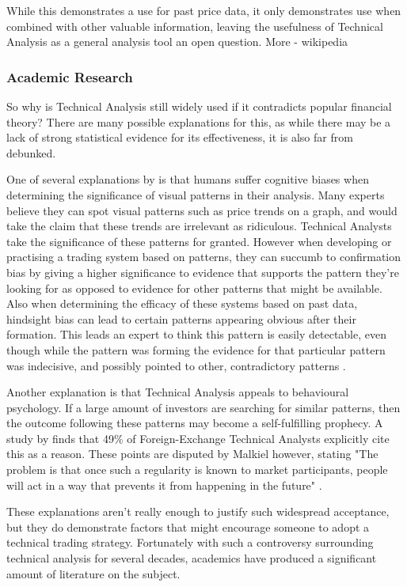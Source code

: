 \documentclass{article}
\begin{document}
While this demonstrates a use for past price data, it only demonstrates use when combined with other valuable information, leaving the usefulness of Technical Analysis as a general analysis tool an open question. More - wikipedia

\subsubsection{Academic Research}

So why is Technical Analysis still widely used if it contradicts popular financial theory? There are many possible explanations for this, as while there may be a lack of strong statistical evidence for its effectiveness, it is also far from debunked. 	

One of several explanations by \cite[p.45-71]{aronson2011evidence} is that humans suffer cognitive biases when determining the significance of visual patterns in their analysis. Many experts believe they can spot visual patterns such as price trends on a graph, and would take the claim that these trends are irrelevant as ridiculous. Technical Analysts take the significance of these patterns for granted. However when developing or practising a trading system based on patterns, they can succumb to confirmation bias by giving a higher significance to evidence that supports the pattern they're looking for as opposed to evidence for other patterns that might be available. Also when determining the efficacy of these systems based on past data, hindsight bias can lead to certain patterns appearing obvious after their formation. This leads an expert to think this pattern is easily detectable, even though while the pattern was forming the evidence for that particular pattern was indecisive, and possibly pointed to other, contradictory patterns \cite[p.62]{aronson2011evidence}.

Another explanation is that Technical Analysis appeals to behavioural psychology. If a large amount of investors are searching for similar patterns, then the outcome following these patterns may become a self-fulfilling prophecy. A study by \cite{examininguse1997} finds that 49\% of Foreign-Exchange Technical Analysts explicitly cite this as a reason. These points are disputed by Malkiel however, stating "The problem is that once such a regularity is known to market participants, people will act in a way that prevents it from happening in the future" \cite[p.162]{randomwalk2012}.

These explanations aren't really enough to justify such widespread acceptance, but they do demonstrate factors that might encourage someone to adopt a technical trading strategy. Fortunately with such a controversy surrounding technical analysis for several decades, academics have produced a significant amount of literature on the subject.
\end{document}
